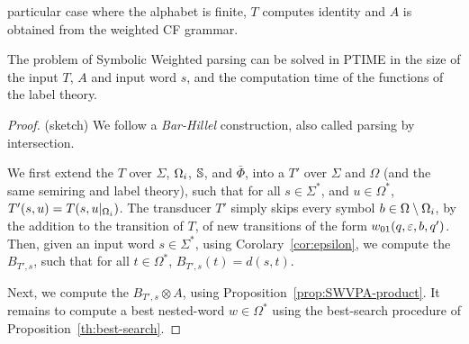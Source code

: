 particular case where the alphabet is finite, 
$T$ computes identity and $A$ is obtained from the weighted CF grammar.


%
\begin{proposition}
The problem of Symbolic Weighted  parsing 
can be solved in PTIME in the size of the input \SWT $T$, \SWVPA $A$
and input word $s$, 
and the computation time of the functions of the label theory.
\end{proposition}
\begin{proof} (sketch)
We follow a \emph{Bar-Hillel} construction, also called parsing by intersection.

\noindent
We first extend the \SWT $T$ over $\Sigma$, $\Omegai$, $\mathbb{S}$, and $\bar\Phi$, 
into a \SWT $T'$ over $\Sigma$ and $\Omega$ (and the same semiring and label theory),
such that for all $s \in \Sigma^*$, and $u \in {\Omega}^*$, 
$T'(s, u) = T(s, u|_{\Omegai})$. The transducer $T'$ simply skips every symbol 
$b \in {\Omega} \setminus \Omegai$, 
by the addition to the transition of $T$,
of new transitions of the form $\wei_{01}(q, \varepsilon, b, q')$.
%
\noindent
Then, given an input word $s \in \Sigma^*$, 
using Corolary~\ref{cor:epsilon}, 
we compute the \SWA $B_{T', s}$, 
such that for all $t \in \Omega^*$, $B_{T', s}(t) = d(s, t)$.
%

\noindent
Next, %
we compute the \SWVPA $B_{T', s} \otimes A$, 
using Proposition~\ref{prop:SWVPA-product}.
%
\noindent
It remains to compute a best nested-word $w \in {\Omega}^*$ 
using the best-search procedure of Proposition~\ref{th:best-search}.
\end{proof}

